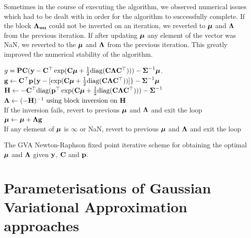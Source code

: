 Sometimes in the course of  executing the algorithm, we observed numerical
issues which had to be dealt with in order for the algorithm to successfully
complete. If the block ${\boldsymbol \Lambda}_{{\bf u} {\bf u}}$ could not be inverted on an
iteration, we reverted to ${\boldsymbol \mu}$ and ${\boldsymbol \Lambda}$ from the previous iteration. If
after updating ${\boldsymbol \mu}$ any element of the vector was NaN, we reverted to the
${\boldsymbol \mu}$ and ${\boldsymbol \Lambda}$ from the previous iteration. This greatly improved the
numerical stability of the algorithm.

\begin{algorithm}
	\begin{algorithmic}
		\REQUIRE $g = {\bf P} {\bf C} ({\bf y} - {\bf C}^\top \exp({\bf C} {\boldsymbol \mu}
                      + \tfrac{1}{2} \text{diag}{({\bf C}{\boldsymbol\Lambda}{\bf C}^\top)})) 
                      - {\boldsymbol \Sigma}^{-1} {\boldsymbol \mu}$.
               \STATE ${\bf g} \leftarrow {\bf C}^\top {\bf p} \{{\bf y} - [ \exp({\bf C} {\boldsymbol \mu}
                   + \tfrac{1}{2} \text{diag}({\bf C} {\boldsymbol \Lambda} {\bf C}^\top))]\} 
                    - {\boldsymbol \Sigma}^{-1} {\boldsymbol \mu}$ \\
			\STATE ${\bf H} \leftarrow
                    -{\bf C}^\top \text{diag}({\bf p}^\top \exp({\bf C} {\boldsymbol \mu} 
                    + \tfrac{1}{2} \text{diag}({\bf C} {\boldsymbol \Lambda} {\bf C}^\top))) - {\boldsymbol \Sigma}^{-1}$ \\
			\STATE ${\boldsymbol \Lambda} \leftarrow (-{\bf H})^{-1}
                    \text{ using block inversion on } {\bf H}$ \\
			If the inversion fails, revert to previous ${\boldsymbol \mu}$ and ${\boldsymbol \Lambda}$
            and exit the loop \\
			\STATE ${\boldsymbol \mu} \leftarrow {\boldsymbol\mu} + {\boldsymbol \Lambda} {\bf g}$ \\
			If any element of ${\boldsymbol \mu}$ is $\infty$ or NaN, revert to previous 
            ${\boldsymbol \mu}$ and ${\boldsymbol \Lambda}$ and exit the loop
		\ENDWHILE
	\end{algorithmic}
	\caption{The GVA Newton-Raphson fixed point iterative scheme for obtaining the optimal ${\boldsymbol \mu}$ and ${\boldsymbol \Lambda}$
		given ${\bf y}$, ${\bf C}$ and ${\bf p}$.}
	\label{alg:algorithm_nr}
\end{algorithm}

\section{Parameterisations of Gaussian Variational Approximation approaches}
\label{sec:param}
